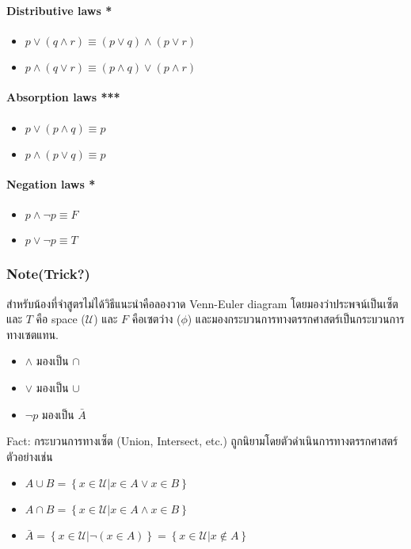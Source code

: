 \documentclass[12pt,a4paper]{article}
\begin{document}
\paragraph{Distributive laws *}
\begin{itemize}
    \item $p \lor (q \land r) \equiv (p \lor q) \land (p \lor r)$
    \item $p \land (q \lor r) \equiv (p \land q) \lor (p \land r)$
\end{itemize}

\paragraph{Absorption laws ***}
\begin{itemize}
    \item $p \lor (p \land q) \equiv p$
    \item $p \land (p \lor q) \equiv p$
\end{itemize}
\paragraph{Negation laws *}
\begin{itemize}
    \item $p \land \neg p \equiv F$
    \item $p \lor \neg p \equiv T$
\end{itemize}

\subsubsection*{Note(Trick?)}
สำหรับน้องที่จำสูตรไม่ได้วิธีแนะนำคือลองวาด Venn-Euler diagram โดยมองว่าประพจน์เป็นเซ็ต และ $T$ คือ space ($\mathcal{U}$) และ $F$ คือเซตว่าง ($\phi$) และมองกระบวนการทางตรรกศาสตร์เป็นกระบวนการทางเซตแทน. \\
\begin{itemize}
    \item $\land$ มองเป็น $\cap$
    \item $\lor$ มองเป็น $\cup$
    \item $\neg p$ มองเป็น $\bar{A}$
\end{itemize}


\rule{0pt}{4ex}
Fact: กระบวนการทางเซ็ต (Union, Intersect, etc.) ถูกนิยามโดยตัวดำเนินการทางตรรกศาสตร์
ตัวอย่างเช่น
\begin{itemize}
    \item $A \cup B = \left\{x \in \mathcal{U} | x \in A \lor x\in B \right\}$
    \item $A \cap B = \left\{x \in \mathcal{U}| x \in A \land x\in B \right\}$
    \item $\bar{A} = \left\{x \in \mathcal{U}| \neg( x \in A) \right\} = \left\{x \in \mathcal{U}| x \not\in A\right\}$
\end{itemize}
\hrulefill
\newpage
\end{document}
